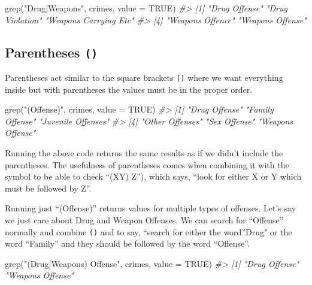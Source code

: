 \documentclass[
  12pt,
]{book}
\newenvironment{Shaded}{\begin{snugshade}}{\end{snugshade}}
\newcommand{\AttributeTok}[1]{\textcolor[rgb]{0.61,0.61,0.61}{#1}}
\newcommand{\CommentTok}[1]{\textcolor[rgb]{0.37,0.37,0.37}{\textit{#1}}}
\newcommand{\ConstantTok}[1]{\textcolor[rgb]{0,0,0}{#1}}
\newcommand{\FunctionTok}[1]{\textcolor[rgb]{0,0,0}{#1}}
\newcommand{\NormalTok}[1]{#1}
\newcommand{\StringTok}[1]{\textcolor[rgb]{0.5,0.5,0.5}{#1}}
\begin{document}
\begin{Shaded}
\begin{Highlighting}[]
\FunctionTok{grep}\NormalTok{(}\StringTok{"Drug|Weapons"}\NormalTok{, crimes, }\AttributeTok{value =} \ConstantTok{TRUE}\NormalTok{)}
\CommentTok{\#\textgreater{} [1] "Drug Offense"         "Drug Violation"       "Weapons Carrying Etc"}
\CommentTok{\#\textgreater{} [4] "Weapons Offence"      "Weapons Offense"}
\end{Highlighting}
\end{Shaded}

\hypertarget{parentheses}{%
\subsection{\texorpdfstring{Parentheses \texttt{()}}{Parentheses ()}}\label{parentheses}}

Parentheses act similar to the square brackets \texttt{{[}{]}} where we want everything inside but with parentheses the values must be in the proper order.

\begin{Shaded}
\begin{Highlighting}[]
\FunctionTok{grep}\NormalTok{(}\StringTok{"(Offense)"}\NormalTok{, crimes, }\AttributeTok{value =} \ConstantTok{TRUE}\NormalTok{)}
\CommentTok{\#\textgreater{} [1] "Drug Offense"      "Family Offense"    "Juvenile Offenses"}
\CommentTok{\#\textgreater{} [4] "Other Offenses"    "Sex Offense"       "Weapons Offense"}
\end{Highlighting}
\end{Shaded}

Running the above code returns the same results as if we didn't include the parentheses. The usefulness of parentheses comes when combining it with the \texttt{\textbar{}} symbol to be able to check ``(X\textbar Y) Z''), which says, ``look for either X or Y which must be followed by Z''.

Running just ``(Offense)'' returns values for multiple types of offenses. Let's say we just care about Drug and Weapon Offenses. We can search for ``Offense'' normally and combine \texttt{()} and \texttt{\textbar{}} to say, ``search for either the word''Drug" or the word ``Family'' and they should be followed by the word ``Offense''.

\begin{Shaded}
\begin{Highlighting}[]
\FunctionTok{grep}\NormalTok{(}\StringTok{"(Drug|Weapons) Offense"}\NormalTok{, crimes, }\AttributeTok{value =} \ConstantTok{TRUE}\NormalTok{)}
\CommentTok{\#\textgreater{} [1] "Drug Offense"    "Weapons Offense"}
\end{Highlighting}
\end{Shaded}
\end{document}
